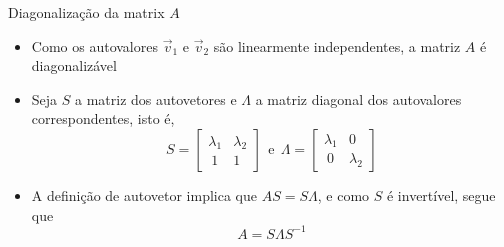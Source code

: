 \begin{frame}[fragile]{Diagonalização da matrix $A$}

    \begin{itemize}
        \item Como os autovalores $\vec{v}_1$ e $\vec{v}_2$ são linearmente independentes,
            a matriz $A$ é diagonalizável

        \item Seja $S$ a matriz dos autovetores e $\Lambda$ a matriz diagonal dos autovalores
            correspondentes, isto é,
        \[
             S = \begin{bmatrix} \lambda_1 & \lambda_2 \\\ 1 & 1 \end{bmatrix}\ \ \mbox{e}\ \
             \Lambda = \begin{bmatrix} \lambda_1 & 0 \\\ 0 & \lambda_2 \end{bmatrix}
        \]

        \item A definição de autovetor implica que $AS = S\Lambda$, e como $S$ é invertível, segue que
        \[
            A = S\Lambda S^{-1}
        \]
        
            
    \end{itemize}

\end{frame}

